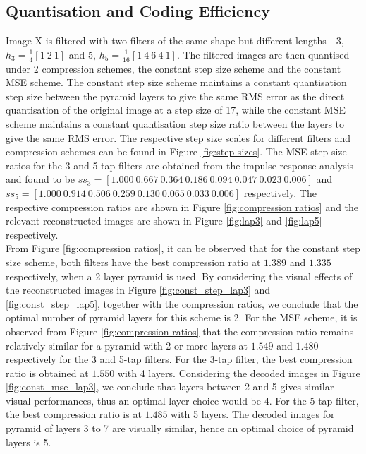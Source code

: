 \subsection{Quantisation and Coding Efficiency} \label{sec:quantisation}

Image X is filtered with two filters of the same shape but different lengths - 3, $h_3 = \frac{1}{4}[1{\ }2{\ }1]$ and 5, $h_5 = \frac{1}{16}[1{\ }4{\ }6{\ }4{\ }1]$. The  filtered images are then quantised under 2 compression schemes, the constant step size scheme and the constant MSE scheme. The constant step size scheme maintains a constant quantisation step size between the pyramid layers to give the same RMS error as the direct quantisation of the original image at a step size of 17, while the constant MSE scheme maintains a constant quantisation step size ratio between the layers to give the same RMS error. The respective step size scales for different filters and compression schemes can be found in Figure \ref{fig:step sizes}. The MSE step size ratios for the 3 and 5 tap filters are obtained from the impulse response analysis and found to be $ss_3 = [1.000 {\ } 0.667 {\ } 0.364 {\ } 0.186 {\ } 0.094 {\ } 0.047 {\ } 0.023 {\ } 0.006]$ and $ss_5 = [1.000 {\ } 0.914 {\ } 0.506 {\ } 0.259 {\ } 0.130 {\ } 0.065 {\ } 0.033 {\ } 0.006]$ respectively. The respective compression ratios are shown in Figure \ref{fig:compression ratios} and the relevant reconstructed images are shown in Figure \ref{fig:lap3} and \ref{fig:lap5} respectively. \\

From Figure \ref{fig:compression ratios}, it can be observed that for the constant step size scheme, both filters have the best compression ratio at $1.389$ and $1.335$ respectively, when a 2 layer pyramid is used. By considering the visual effects of the reconstructed images in Figure \ref{fig:const_step_lap3} and \ref{fig:const_step_lap5}, together with the compression ratios, we conclude that the optimal number of pyramid layers for this scheme is 2. For the MSE scheme, it is observed from Figure \ref{fig:compression ratios} that the compression ratio remains relatively similar for a pyramid with 2 or more layers at $1.549$ and $1.480$ respectively for the 3 and 5-tap filters. For the 3-tap filter, the best compression ratio is obtained at $1.550$ with 4 layers. Considering the decoded images in Figure \ref{fig:const_mse_lap3}, we conclude that layers between 2 and 5 gives similar visual performances, thus an optimal layer choice would be 4. For the  5-tap filter, the best compression ratio is at $1.485$ with 5 layers. The decoded images for pyramid of layers 3 to 7 are visually similar, hence an optimal choice of pyramid layers is 5. \\

